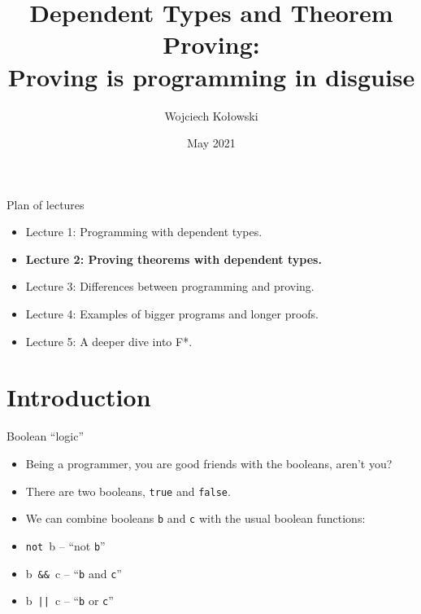 \documentclass{beamer}
\title{Dependent Types and Theorem Proving: \\Proving is programming in disguise}
\author{Wojciech Kołowski}
\date{May 2021}
\newcommand{\m}[1]{\texttt{#1}}
\newcommand{\notb}[1]{not #1}
\newcommand{\andb}[2]{#1 \&\& #2}
\newcommand{\orb}[2]{#1 || #2}
\newcommand{\implb}[2]{#1 ==> #2}
\newcommand{\iffb}[2]{#1 <=> #2}
\newcommand{\mnotb}[1]{\m{not}\ #1}
\newcommand{\mandb}[2]{#1\ \m{\&\&}\ #2}
\newcommand{\morb}[2]{#1\ \m{||}\ #2}
\begin{document}
\frame{\titlepage}

\begin{frame}{Plan of lectures}
\begin{itemize}
	\item Lecture 1: Programming with dependent types.
	\item \textbf{Lecture 2: Proving theorems with dependent types.}
	\item Lecture 3: Differences between programming and proving.
	\item Lecture 4: Examples of bigger programs and longer proofs.
	\item Lecture 5: A deeper dive into F*.
\end{itemize}
\end{frame}

\frame{\tableofcontents}

\section{Introduction}

\begin{frame}{Boolean ``logic''}
\begin{itemize}
	\item Being a programmer, you are good friends with the booleans, aren't you?
	\item There are two booleans, \m{true} and \m{false}.
	\item We can combine booleans \m{b} and \m{c} with the usual boolean functions:
	\item \mnotb{b} -- ``not \m{b}''
	\item \mandb{b}{c} -- ``\m{b} and \m{c}''
	\item \morb{b}{c} -- ``\m{b} or \m{c}''
\end{itemize}
\end{frame}
\end{document}
